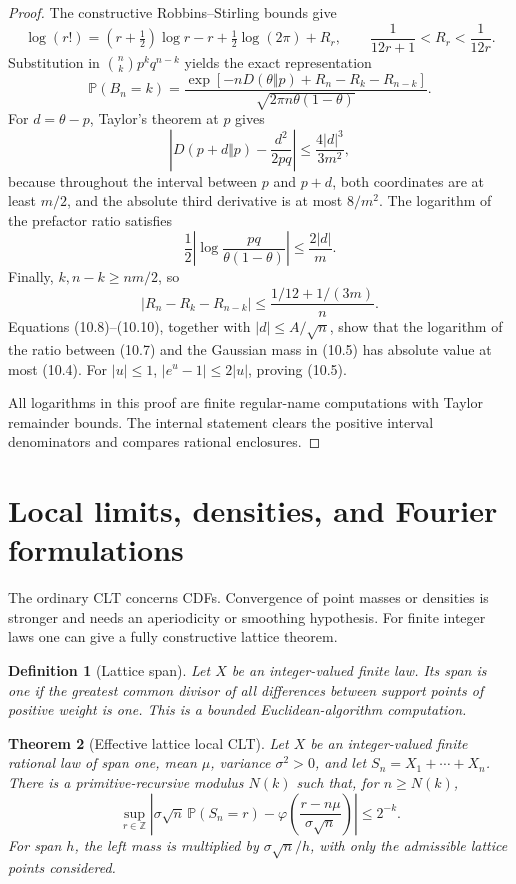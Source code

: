 \documentclass[11pt]{article}
\newtheorem{theorem}{Theorem}[section]
\newtheorem{definition}[theorem]{Definition}
\newcommand{\Pp}{\mathbb P}
\newcommand{\phiN}{\varphi}
\begin{document}
\begin{proof}
The constructive Robbins--Stirling bounds give
\[
 \log(r!)=(r+\tfrac12)\log r-r+\tfrac12\log(2\pi)+R_r,
 \qquad \frac1{12r+1}<R_r<\frac1{12r}.               \tag{10.6}
\]
Substitution in
\(\binom nkp^kq^{n-k}\) yields the exact representation
\[
 \Pp(B_n=k)=
 \frac{\exp[-nD(\theta\Vert p)+R_n-R_k-R_{n-k}]}
      {\sqrt{2\pi n\theta(1-\theta)}}.               \tag{10.7}
\]
For \(d=\theta-p\), Taylor's theorem at \(p\) gives
\[
 \left|D(p+d\Vert p)-\frac{d^2}{2pq}\right|
 \le\frac{4|d|^3}{3m^2},                             \tag{10.8}
\]
because throughout the interval between \(p\) and \(p+d\), both coordinates
are at least \(m/2\), and the absolute third derivative is at most
\(8/m^2\).  The logarithm of the prefactor ratio satisfies
\[
 \frac12\left|
 \log\frac{pq}{\theta(1-\theta)}
 \right|\le\frac{2|d|}{m}.                            \tag{10.9}
\]
Finally, \(k,n-k\ge nm/2\), so
\[
 |R_n-R_k-R_{n-k}|
 \le\frac{1/12+1/(3m)}{n}.                           \tag{10.10}
\]
Equations (10.8)--(10.10), together with \(|d|\le A/\sqrt n\), show that
the logarithm of the ratio between (10.7) and the Gaussian mass in (10.5)
has absolute value at most (10.4).  For \(|u|\le1\),
\(|e^u-1|\le2|u|\), proving (10.5).

All logarithms in this proof are finite regular-name computations with
Taylor remainder bounds.  The internal statement clears the positive
interval denominators and compares rational enclosures.
\end{proof}

\section{Local limits, densities, and Fourier formulations}
\label{sec:local-limit}

The ordinary CLT concerns CDFs.  Convergence of point masses or densities is
stronger and needs an aperiodicity or smoothing hypothesis.  For finite
integer laws one can give a fully constructive lattice theorem.

\begin{definition}[Lattice span]
Let \(X\) be an integer-valued finite law.  Its span is one if the greatest
common divisor of all differences between support points of positive weight
is one.  This is a bounded Euclidean-algorithm computation.
\end{definition}

\begin{theorem}[Effective lattice local CLT]\label{thm:lattice-local}
Let \(X\) be an integer-valued finite rational law of span one, mean \(\mu\),
variance \(\sigma^2>0\), and let \(S_n=X_1+\cdots+X_n\).  There is a
primitive-recursive modulus \(N(k)\) such that, for \(n\ge N(k)\),
\[
 \sup_{r\in\mathbb Z}
 \left|
  \sigma\sqrt n\,\Pp(S_n=r)
  -\phiN\!\left(\frac{r-n\mu}{\sigma\sqrt n}\right)
 \right|\le2^{-k}.                                    \tag{11.1}
\]
For span \(h\), the left mass is multiplied by \(\sigma\sqrt n/h\), with
only the admissible lattice points considered.
\end{theorem}
\end{document}
